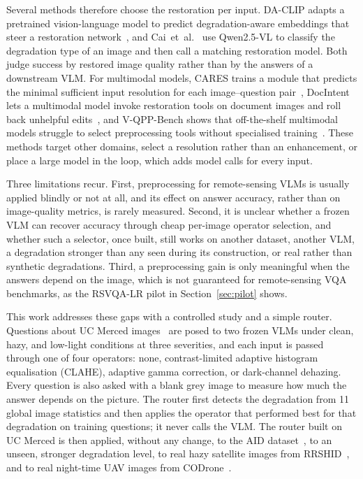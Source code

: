 \documentclass[lettersize,journal]{IEEEtran}
\begin{document}
Several methods therefore choose the restoration per input. DA-CLIP adapts a pretrained vision-language model to predict degradation-aware embeddings that steer a restoration network~\cite{luo2024daclip}, and Cai~et~al.~\cite{cai2025degradationaware} use Qwen2.5-VL to classify the degradation type of an image and then call a matching restoration model. Both judge success by restored image quality rather than by the answers of a downstream VLM. For multimodal models, CARES trains a module that predicts the minimal sufficient input resolution for each image--question pair~\cite{kimhi2025cares}, DocIntent lets a multimodal model invoke restoration tools on document images and roll back unhelpful edits~\cite{huang2026docintent}, and V-QPP-Bench shows that off-the-shelf multimodal models struggle to select preprocessing tools without specialised training~\cite{zeng2026fixbeforesearch}. These methods target other domains, select a resolution rather than an enhancement, or place a large model in the loop, which adds model calls for every input.

Three limitations recur. First, preprocessing for remote-sensing VLMs is usually applied blindly or not at all, and its effect on answer accuracy, rather than on image-quality metrics, is rarely measured. Second, it is unclear whether a frozen VLM can recover accuracy through cheap per-image operator selection, and whether such a selector, once built, still works on another dataset, another VLM, a degradation stronger than any seen during its construction, or real rather than synthetic degradations. Third, a preprocessing gain is only meaningful when the answers depend on the image, which is not guaranteed for remote-sensing VQA benchmarks, as the RSVQA-LR pilot in Section~\ref{sec:pilot} shows.

This work addresses these gaps with a controlled study and a simple router. Questions about UC Merced images~\cite{yang2010ucm, chaudhuri2018multilabel} are posed to two frozen VLMs under clean, hazy, and low-light conditions at three severities, and each input is passed through one of four operators: none, contrast-limited adaptive histogram equalisation (CLAHE), adaptive gamma correction, or dark-channel dehazing. Every question is also asked with a blank grey image to measure how much the answer depends on the picture. The router first detects the degradation from 11 global image statistics and then applies the operator that performed best for that degradation on training questions; it never calls the VLM. The router built on UC Merced is then applied, without any change, to the AID dataset~\cite{xia2017aid}, to an unseen, stronger degradation level, to real hazy satellite images from RRSHID~\cite{zhu2025rrshid}, and to real night-time UAV images from CODrone~\cite{ye2025codrone}.
\end{document}
